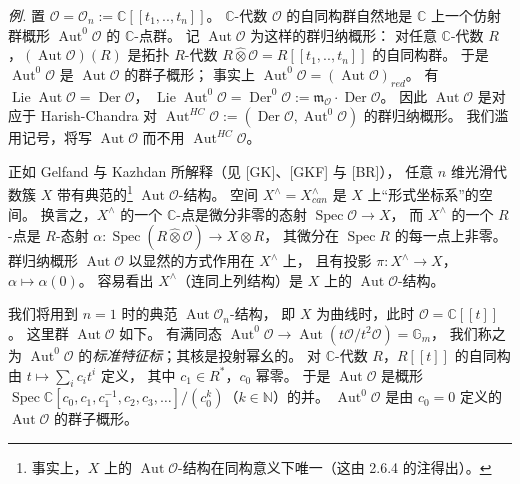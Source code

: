 \emph{例.} 置 $\mathcal{O}=\mathcal{O}_n:=\mathbb{C}[[t_1,..,t_n]]$。
$\mathbb{C}$-代数 $\mathcal{O}$ 的自同构群自然地是 $\mathbb{C}$ 上一个仿射群概形
$\operatorname{Aut}^0\mathcal{O}$ 的 $\mathbb{C}$-点群。
记 $\operatorname{Aut}\mathcal{O}$ 为这样的群归纳概形：
对任意 $\mathbb{C}$-代数 $R$，$(\operatorname{Aut}\mathcal{O})(R)$ 是拓扑 $R$-代数
$R\hat{\otimes}\mathcal{O}=R[[t_1,..,t_n]]$ 的自同构群。
于是 $\operatorname{Aut}^0\mathcal{O}$ 是 $\operatorname{Aut}\mathcal{O}$ 的群子概形；
事实上 $\operatorname{Aut}^0\mathcal{O}=(\operatorname{Aut}\mathcal{O})_{red}$。
有 $\operatorname{Lie}\operatorname{Aut}\mathcal{O}=\operatorname{Der}\mathcal{O}$，
$\operatorname{Lie}\operatorname{Aut}^0\mathcal{O}=\operatorname{Der}^0\mathcal{O}
:=\mathfrak{m}_{\mathcal{O}}\cdot\operatorname{Der}\mathcal{O}$。
因此 $\operatorname{Aut}\mathcal{O}$ 是对应于 Harish-Chandra 对
$\operatorname{Aut}^{HC}\mathcal{O}:=(\operatorname{Der}\mathcal{O},\operatorname{Aut}^0\mathcal{O})$ 的群归纳概形。
我们滥用记号，将写 $\operatorname{Aut}\mathcal{O}$ 而不用 $\operatorname{Aut}^{HC}\mathcal{O}$。

正如 Gelfand 与 Kazhdan 所解释（见 [GK]、[GKF] 与 [BR]），
任意 $n$ 维光滑代数簇 $X$ 带有典范的\footnote{事实上，$X$ 上的 $\operatorname{Aut}\mathcal{O}$-结构在同构意义下唯一（这由 2.6.4 的注得出）。}
$\operatorname{Aut}\mathcal{O}$-结构。
空间 $X^{\wedge}=X^{\wedge}_{can}$ 是 $X$ 上“形式坐标系”的空间。
换言之，$X^{\wedge}$ 的一个 $\mathbb{C}$-点是微分非零的态射 $\operatorname{Spec}\mathcal{O}\to X$，
而 $X^{\wedge}$ 的一个 $R$-点是 $R$-态射
$\alpha: \operatorname{Spec}(R\hat{\otimes}\mathcal{O})\to X\otimes R$，
其微分在 $\operatorname{Spec} R$ 的每一点上非零。
群归纳概形 $\operatorname{Aut}\mathcal{O}$ 以显然的方式作用在 $X^{\wedge}$ 上，
且有投影 $\pi: X^{\wedge}\to X$，$\alpha\mapsto\alpha(0)$。
容易看出 $X^{\wedge}$（连同上列结构）是 $X$ 上的 $\operatorname{Aut}\mathcal{O}$-结构。

我们将用到 $n=1$ 时的典范 $\operatorname{Aut}\mathcal{O}_n$-结构，
即 $X$ 为曲线时，此时 $\mathcal{O}=\mathbb{C}[[t]]$。
这里群 $\operatorname{Aut}\mathcal{O}$ 如下。
有满同态
$\operatorname{Aut}^0\mathcal{O}\to\operatorname{Aut}(t\mathcal{O}/t^2\mathcal{O})=\mathbb{G}_m$，
我们称之为 $\operatorname{Aut}^0\mathcal{O}$ 的\emph{标准特征标}；其核是投射幂幺的。
对 $\mathbb{C}$-代数 $R$，$R[[t]]$ 的自同构由 $t\mapsto\sum_i c_i t^i$ 定义，
其中 $c_1\in R^*$，$c_0$ 幂零。
于是 $\operatorname{Aut}\mathcal{O}$ 是概形
$\operatorname{Spec}\mathbb{C}[c_0,c_1,c_1^{-1},c_2,c_3,\dots]/(c_0^k)$（$k\in\mathbb{N}$）的并。
$\operatorname{Aut}^0\mathcal{O}$ 是由 $c_0=0$ 定义的 $\operatorname{Aut}\mathcal{O}$ 的群子概形。

